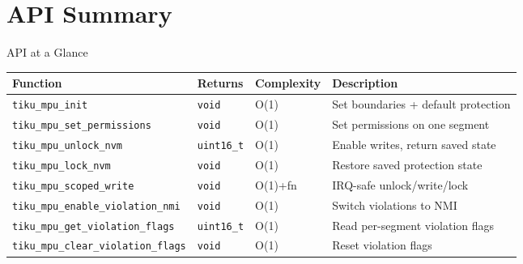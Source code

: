 \documentclass[aspectratio=169, 10pt]{beamer}
\begin{document}
\section{API Summary}

\begin{frame}{API at a Glance}
\begin{table}
\centering
\small
\begin{tabular}{@{}llll@{}}
\toprule
\textbf{Function} & \textbf{Returns} & \textbf{Complexity} & \textbf{Description} \\
\midrule
\texttt{tiku\_mpu\_init}       & \texttt{void}     & O(1) & Set boundaries + default protection \\
\texttt{tiku\_mpu\_set\_permissions} & \texttt{void} & O(1) & Set permissions on one segment \\
\texttt{tiku\_mpu\_unlock\_nvm}   & \texttt{uint16\_t} & O(1) & Enable writes, return saved state \\
\texttt{tiku\_mpu\_lock\_nvm}    & \texttt{void}     & O(1) & Restore saved protection state \\
\texttt{tiku\_mpu\_scoped\_write} & \texttt{void}     & O(1)+fn & IRQ-safe unlock/write/lock \\
\texttt{tiku\_mpu\_enable\_violation\_nmi} & \texttt{void} & O(1) & Switch violations to NMI \\
\texttt{tiku\_mpu\_get\_violation\_flags} & \texttt{uint16\_t} & O(1) & Read per-segment violation flags \\
\texttt{tiku\_mpu\_clear\_violation\_flags} & \texttt{void} & O(1) & Reset violation flags \\
\bottomrule
\end{tabular}
\end{table}


\end{frame}
\end{document}

